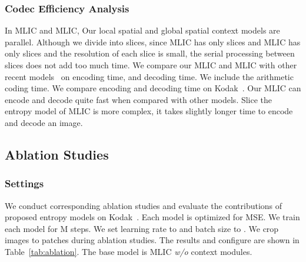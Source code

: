 \documentclass[sigconf]{acmart}
\begin{document}
\subsubsection{Codec Efficiency Analysis}
In MLIC and MLIC, Our local spatial and global spatial context models are parallel.
Although we divide  into slices,
since MLIC has only  slices and MLIC has
only  slices and the resolution of each slice is small,
the serial processing between slices does not add too much time.
We compare our MLIC and MLIC with
other recent models~\cite{DBLP:conf/cvpr/ChengSTK20,DBLP:conf/icip/MinnenS20,
DBLP:conf/mm/XieCC21,DBLP:journals/corr/abs-2202-05492,
DBLP:journals/corr/abs-2203-08450,He_2022_CVPR}
on encoding time, and decoding time.
We include the arithmetic coding time.
We compare encoding and decoding time on Kodak~\cite{kodak}.
Our MLIC can encode and decode quite fast when compared with other models.
Slice the entropy model of MLIC is more complex, it takes slightly longer time to
encode and decode an image.
\subsection{Ablation Studies}
\subsubsection{Settings}
We conduct corresponding ablation studies and
evaluate the contributions of proposed entropy models on
Kodak~\cite{kodak}.
Each model is optimized for MSE.
We train each model for M steps.
We set learning rate to  and batch size to . We crop images to 
patches during ablation studies.
The results and configure are shown in Table~\ref{tab:ablation}.
The base model is MLIC \textit{w/o} context modules.
\end{document}
